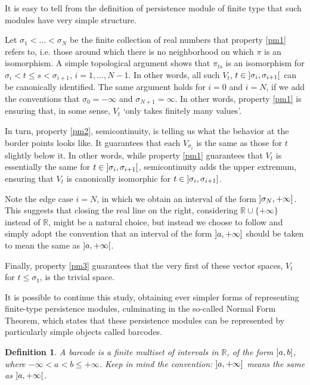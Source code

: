 \documentclass{article}
\newtheorem{definition}{Definition}
\theoremstyle{nonumberplain}
\newcommand{\R}{\mathbb{R}}
\begin{document}
It is easy to tell from the definition of persistence module of finite type  that such modules have very simple structure.

Let $\sigma_1 < \dots < \sigma_N$ be the finite collection of real numbers that property \ref{pm1} refers to, i.e. those around which there is no neighborhood on which $\pi$ is an isomorphism. A simple topological argument shows that $\pi_{ts}$ is an isomorphism for $\sigma_i < t \leq s < \sigma_{i+1}$, $i = 1, \dots, N-1$. In other words, all such $V_t$, $t \in \ointerval{\sigma_i}{\sigma_{i+1}}$ can be canonically identified. The same argument holds for $i = 0$ and $i = N$, if we add the conventions that $\sigma_0 = -\infty$ and $\sigma_{N+1} = \infty$. In other words, property \ref{pm1} is ensuring that, in some sense, $V_t$ `only takes finitely many values'.

In turn, property \ref{pm2}, semicontinuity, is telling us what the behavior at the border points looks like. It guarantees that each $V_{\sigma_i}$ is the same as those for $t$ slightly below it. In other words, while property \ref{pm1} guarantees that $V_t$ is essentially the same for $t \in \ointerval{\sigma_i}{\sigma_{i+1}}$, semicontinuity adds the upper extremum, ensuring that $V_t$ is canonically isomorphic for $t \in \linterval{\sigma_i}{\sigma_{i+1}}$.

Note the edge case $i = N$, in which we obtain an interval of the form $\linterval{\sigma_N}{+\infty}$. This suggests that closing the real line on the right, considering $\R \cup \{+\infty\}$ instead of $\R$, might be a natural choice, but instead we choose to follow \cite{polterovich} and simply adopt the convention that an interval of the form $\linterval{a}{+\infty}$ should be taken to mean the same as $\ointerval{a}{+\infty}$.

Finally, property \ref{pm3} guarantees that the very first of these vector spaces, $V_t$ for $t \leq \sigma_1$, is the trivial space.

It is possible to continue this study, obtaining ever simpler forms of representing finite-type persistence modules, culminating in the so-called Normal Form Theorem, which states that these persistence modules can be represented by particularly simple objects called barcodes.

\begin{definition}
A \emph{barcode} is a finite multiset of intervals in $\R$, of the form $\linterval a b$, where $-\infty < a < b \leq +\infty$. Keep in mind the convention: $\linterval a {+\infty}$ means the same as $\ointerval a {+\infty}$.
\end{definition}
\end{document}
